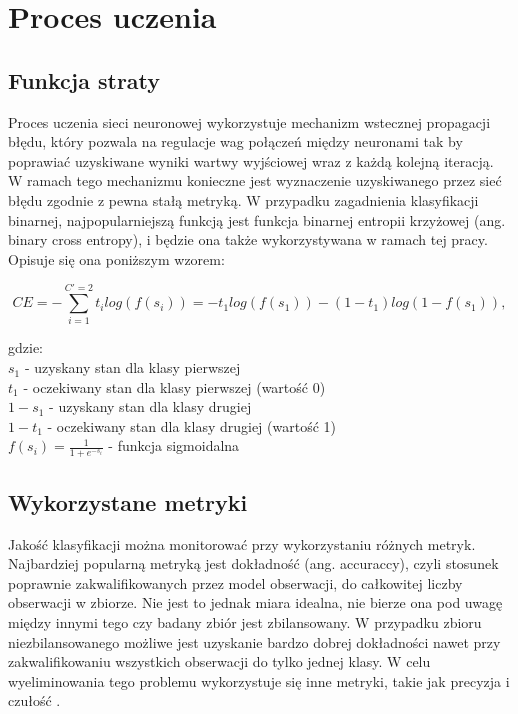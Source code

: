 \newpage %
\section{Proces uczenia}



\subsection{Funkcja straty}

Proces uczenia sieci neuronowej wykorzystuje mechanizm wstecznej propagacji błędu, który pozwala na regulacje wag połączeń między neuronami tak by poprawiać uzyskiwane wyniki wartwy wyjściowej wraz z każdą kolejną iteracją. W ramach tego mechanizmu konieczne jest wyznaczenie uzyskiwanego przez sieć błędu zgodnie z pewna stałą metryką. W przypadku zagadnienia klasyfikacji binarnej, najpopularniejszą funkcją jest funkcja binarnej entropii krzyżowej (ang. binary cross entropy), i będzie ona także wykorzystywana w ramach tej pracy. Opisuje się ona poniższym wzorem: 

$$
CE = -\sum_{i=1}^{C'=2}t_{i} log (f(s_{i})) = -t_{1} log(f(s_{1})) - (1 - t_{1}) log(1 - f(s_{1})),
$$


\noindent gdzie: \\
$s_1$ - uzyskany stan dla klasy pierwszej \\
$t_1$ - oczekiwany stan dla klasy pierwszej (wartość 0)\\
$1-s_1$ - uzyskany stan dla klasy drugiej \\
$1-t_1$ - oczekiwany stan dla klasy drugiej (wartość 1) \\
$f(s_i)=\frac{1}{1+e^{-s_i}}$ - funkcja sigmoidalna



\subsection{Wykorzystane metryki}

Jakość klasyfikacji można monitorować przy wykorzystaniu różnych metryk. Najbardziej popularną metryką jest dokładność (ang. accuraccy), czyli stosunek poprawnie zakwalifikowanych przez model obserwacji, do całkowitej liczby obserwacji w zbiorze. Nie jest to jednak miara idealna, nie bierze ona pod uwagę między innymi tego czy badany zbiór jest zbilansowany. W przypadku zbioru niezbilansowanego możliwe jest uzyskanie bardzo dobrej dokładności nawet przy zakwalifikowaniu wszystkich obserwacji do tylko jednej klasy. W celu wyeliminowania tego problemu wykorzystuje się inne metryki, takie jak precyzja i czułość \cite{metryki_3}.



